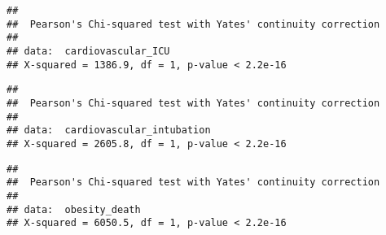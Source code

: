 \documentclass[
]{article}
\newenvironment{Shaded}{\begin{snugshade}}{\end{snugshade}}
\newcommand{\CommentTok}[1]{\textcolor[rgb]{0.56,0.35,0.01}{\textit{#1}}}
\newcommand{\FunctionTok}[1]{\textcolor[rgb]{0.00,0.00,0.00}{#1}}
\newcommand{\NormalTok}[1]{#1}
\newcommand{\OtherTok}[1]{\textcolor[rgb]{0.56,0.35,0.01}{#1}}
\newcommand{\SpecialCharTok}[1]{\textcolor[rgb]{0.00,0.00,0.00}{#1}}
\begin{document}
\begin{Shaded}
\end{Shaded}

\begin{verbatim}
## 
##  Pearson's Chi-squared test with Yates' continuity correction
## 
## data:  cardiovascular_ICU
## X-squared = 1386.9, df = 1, p-value < 2.2e-16
\end{verbatim}

\begin{Shaded}
\end{Shaded}

\begin{verbatim}
## 
##  Pearson's Chi-squared test with Yates' continuity correction
## 
## data:  cardiovascular_intubation
## X-squared = 2605.8, df = 1, p-value < 2.2e-16
\end{verbatim}

\begin{Shaded}
\end{Shaded}

\begin{verbatim}
## 
##  Pearson's Chi-squared test with Yates' continuity correction
## 
## data:  obesity_death
## X-squared = 6050.5, df = 1, p-value < 2.2e-16
\end{verbatim}
\end{document}
